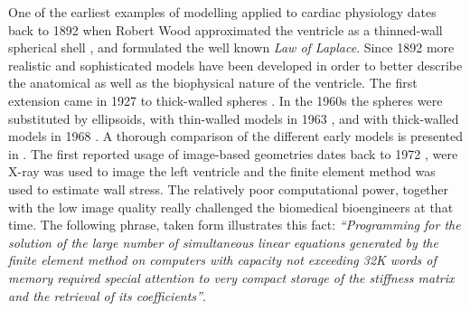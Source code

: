 One of the earliest examples of modelling applied to cardiac
physiology dates back to 1892 when Robert Wood approximated the
ventricle as a thinned-wall spherical shell \cite{woods1892few}, and
formulated the well known \emph{Law of Laplace}.
Since 1892 more realistic and sophisticated models have been developed
in order to better describe the anatomical as well as the biophysical
nature of the ventricle. The first extension came in 1927 to
thick-walled spheres \cite{love2013treatise}. In the 1960s the spheres
were substituted by ellipsoids, with thin-walled models in 1963
\cite{sandler1963left}, and with thick-walled models in 1968
\cite{wong1968stress}. A thorough comparison of the different early
models  is presented in \cite{huisman1980comparison}. The first
reported usage of image-based geometries dates back to 1972
\cite{gould1972vivo}, were X-ray was used to image the left ventricle
and the finite element method was used to estimate wall stress. The relatively
poor computational power, together with the low image quality really
challenged the biomedical bioengineers at that time. The following
phrase, taken form \cite{heethaar1977computer} illustrates this fact:  
\emph{``Programming for the solution of the large number of
  simultaneous linear equations generated by the finite element method
  on computers with capacity not exceeding 32K words of memory
  required special attention to very compact storage of the
  stiffness matrix and the retrieval of its coefficients''}.

